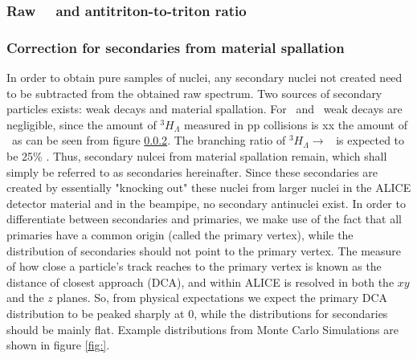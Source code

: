 \begin{table}
\end{table}

\subsubsection{Raw \ratio\ \ and antitriton-to-triton ratio}
\subsubsection{Correction for secondaries from material spallation}
In order to obtain pure samples of nuclei, any secondary nuclei not created need to be subtracted from the obtained raw spectrum. Two sources of secondary particles exists: weak decays and material spallation. For \ahe\ and \atrit\, weak decays are negligible, since the amount of $^3H_\Lambda$ measured in pp collisions is xx the amount of \ahe\, as can be seen from figure \ref{}. The branching ratio of $^3H_\Lambda \rightarrow $ \ahe\ is expected to be 25\% \cite{PDG}. Thus, secondary nulcei from material spallation remain, which shall simply be referred to as secondaries hereinafter. Since these secondaries are created by essentially "knocking out" these nuclei from larger nuclei in the ALICE detector material and in the beampipe, no secondary antinuclei exist. In order to differentiate between secondaries and primaries, we make use of the fact that all primaries have a common origin (called the primary vertex), while the distribution of secondaries should not point to the primary vertex. The measure of how close a particle's track reaches to the primary vertex is known as the distance of closest approach (DCA), and within ALICE is resolved in both the $xy$ and the $z$ planes. So, from physical expectations we expect the primary DCA distribution to be peaked sharply at 0, while the distributions for secondaries should be mainly flat. Example distributions from Monte Carlo Simulations are shown in figure \ref{fig:}.


